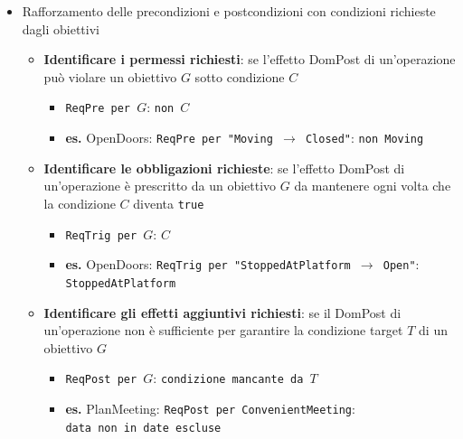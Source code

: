 \begin{itemize}
\begin{figure}[H]
    \end{figure}
    \item Rafforzamento delle precondizioni e postcondizioni con condizioni
    richieste dagli obiettivi
    \begin{itemize}
        \item \textbf{Identificare i permessi richiesti}: se l'effetto DomPost di un'operazione può violare un obiettivo \( G \) sotto condizione \( C \)
        \begin{itemize}
            \item \texttt{ReqPre per \( G \)}: \texttt{non \( C \)}
            \item \textbf{es.} OpenDoors: \texttt{ReqPre per "Moving \(\rightarrow\) Closed"}: \texttt{non Moving}
        \end{itemize}
    
        \item \textbf{Identificare le obbligazioni richieste}: se l'effetto DomPost
        di un'operazione è prescritto da un obiettivo \( G \) da mantenere ogni volta che la condizione \( C \) diventa \texttt{true}
        \begin{itemize}
            \item \texttt{ReqTrig per \( G \)}: \texttt{\( C \)}
            \item \textbf{es.} OpenDoors: \texttt{ReqTrig per "StoppedAtPlatform
            \(\rightarrow\) Open"}: \\\texttt{StoppedAtPlatform}
        \end{itemize}
    
        \item \textbf{Identificare gli effetti aggiuntivi richiesti}: se il
        DomPost di un'operazione non è sufficiente per garantire la condizione
        target \( T \) di un obiettivo \( G \)
        \begin{itemize}
            \item \texttt{ReqPost per \( G \)}: \texttt{condizione mancante da \( T \)}
            \item \textbf{es.} PlanMeeting: \texttt{ReqPost per ConvenientMeeting}:
            \\\texttt{data non in date escluse}
        \end{itemize}
    \end{itemize}
\end{itemize}


  